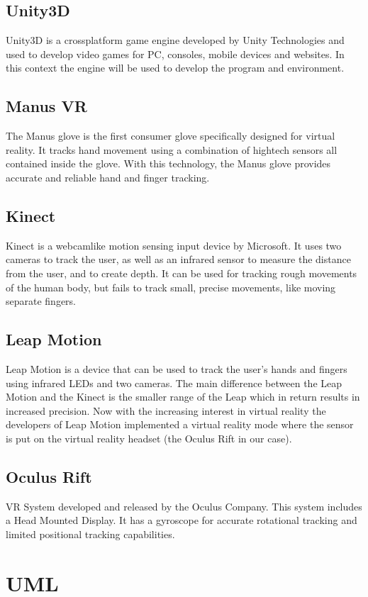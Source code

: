 \documentclass[11pt,a4paper]{report}
\begin{document}
\section*{Unity3D}
Unity3D is a cross­platform game engine developed by Unity Technologies and used to
develop video games for PC, consoles, mobile devices and websites. In this context the engine
will be used to develop the program and environment.
\section*{Manus VR}
The Manus glove is the first consumer glove specifically designed for virtual reality. It tracks
hand movement using a combination of high­tech sensors all contained inside the glove. With
this technology, the Manus glove provides accurate and reliable hand­ and finger tracking.
\section*{Kinect}
Kinect is a webcam­like motion sensing input device by Microsoft. It uses two cameras to
track the user, as well as an infrared sensor to measure the distance from the user, and to
create depth. It can be used for tracking rough movements of the human body, but fails to
track small, precise movements, like moving separate fingers.
\section*{Leap Motion}
Leap Motion is a device that can be used to track the user’s hands and fingers using infrared
LEDs and two cameras. The main difference between the Leap Motion and the Kinect is the
smaller range of the Leap which in return results in increased precision. Now with the
increasing interest in virtual reality the developers of Leap Motion implemented a virtual
reality mode where the sensor is put on the virtual reality headset (the Oculus Rift in our
case).
\section*{Oculus Rift}
VR System developed and released by the Oculus Company. This system includes a Head
Mounted Display. It has a gyroscope for accurate rotational tracking and limited positional
tracking capabilities.


\chapter{UML}

\end{document}

